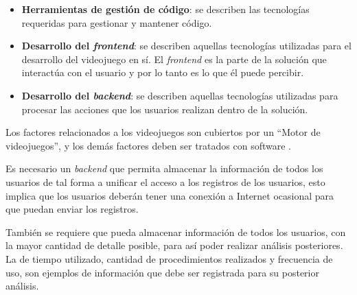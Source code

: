 \begin{itemize}
    \item \textbf{Herramientas de gestión de código}: se describen las
        tecnologías requeridas para gestionar y mantener código.
    \item \textbf{Desarrollo del \textit{frontend}}: se describen aquellas tecnologías
        utilizadas para el desarrollo del videojuego en sí. El \textit{frontend} es la
        parte de la solución que interactúa con el usuario y por lo tanto es lo
        que él puede percibir.
    \item \textbf{Desarrollo del \textit{backend}}: se describen aquellas tecnologías
        utilizadas para procesar las acciones que los usuarios realizan dentro
        de la solución.
\end{itemize}


Los factores relacionados a los videojuegos son cubiertos por un \enquote{Motor
de videojuegos}, y los demás factores deben ser tratados con software
.

Es necesario un \textit{backend} que permita almacenar la información de todos
los usuarios de tal forma a unificar el acceso a los registros de los usuarios,
esto implica que los usuarios deberán tener una conexión a Internet ocasional
para que puedan enviar los registros.

También se requiere que pueda almacenar información de todos los usuarios, con la mayor
cantidad de detalle posible, para así poder realizar análisis posteriores.
La  de tiempo utilizado, cantidad
de procedimientos realizados y frecuencia de uso, son ejemplos de información
que debe ser registrada para su posterior análisis.






